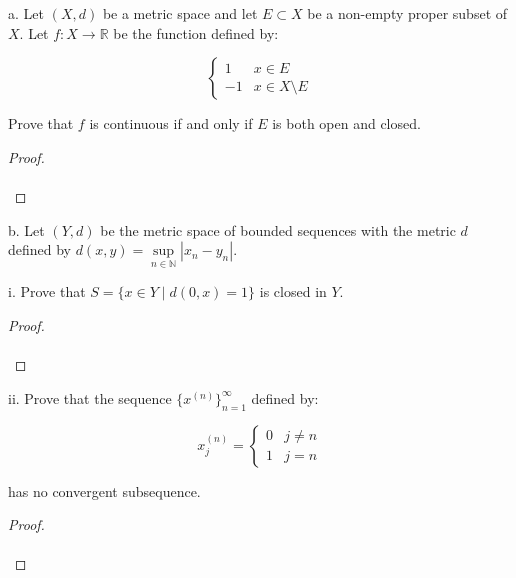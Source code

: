 a. Let $(X, d)$ be a metric space and let $E \subset X$ be a non-empty proper subset of $X$. Let $f:X \to \mathbb{R}$ be
   the function defined by:

   \[
   \begin{cases} 
      1 & x \in E \\
      -1 & x \in X \setminus E
   \end{cases}
   \]

   Prove that $f$ is continuous if and only if $E$ is both open and closed.

\begin{proof}\renewcommand{\qedsymbol}{}\ \\\\
\end{proof}

\pagebreak

b. Let $(Y, d)$ be the metric space of bounded sequences with the metric $d$ defined by 
    $d(x, y) = \sup\limits_{n \in \mathbb{N}}{|x_n - y_n|}$.

    i. Prove that $S = \{ x \in Y \mid d(0, x) = 1 \}$ is closed in $Y$.

    \begin{proof}\renewcommand{\qedsymbol}{}\ \\\\
    \end{proof}

    \pagebreak
    
    ii. Prove that the sequence $\{ x^{(n)} \}_{n=1}^{\infty}$ defined by:

    \[
    x_j^{(n)} = \begin{cases} 
        0 & j \neq n \\
        1 & j = n
    \end{cases}
    \]
        
    has no convergent subsequence.

    \begin{proof}\renewcommand{\qedsymbol}{}\ \\\\
    \end{proof}